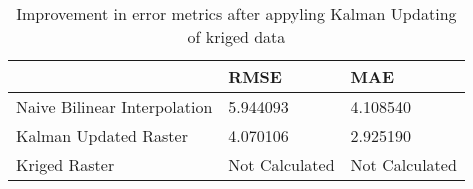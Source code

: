 \begin{table}
\caption{Improvement in error metrics after appyling Kalman Updating of kriged data}
\label{tab:Oahu2_lidar_error}
\begin{tabular}{lll}
\toprule
 & RMSE & MAE \\
\midrule
Naive Bilinear Interpolation & 5.944093 & 4.108540 \\
Kalman Updated Raster & 4.070106 & 2.925190 \\
Kriged Raster & Not Calculated & Not Calculated \\
\bottomrule
\end{tabular}
\end{table}
